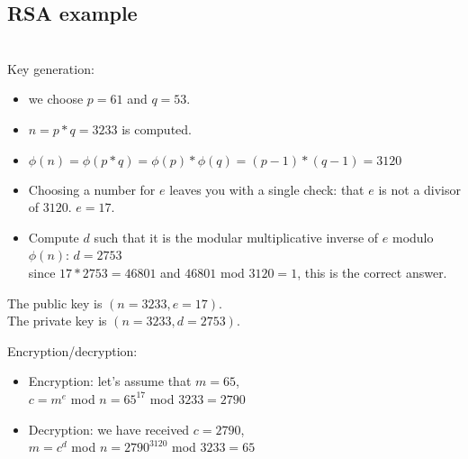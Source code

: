\subsection*{RSA example}\mbox{}\\
Key generation: \vspace{-5mm}
	\begin{itemize}
		\item we choose $p = 61$ and $q = 53 $.
		\item $n= p*q=  3233$ is computed.
		\item $\phi(n)= \phi(p*q)=\phi(p)*\phi(q)=(p-1)*(q-1)=  3120$
		\item Choosing a number for $e$ leaves you with a single check: 
		that $e$ is not a divisor of $3120$. $e = 17$.\\
		\item Compute $d$ such that it is the modular multiplicative inverse of $e$ modulo $\phi(n)$: 
		$d = 2753$\\
		since $17 * 2753 = 46801$ and $46801$ mod $3120 = 1$, this is the correct answer.
	\end{itemize}
	\begin{center}
		The public key is $(n = 3233, e = 17)$.\\
		The private key is $(n = 3233, d = 2753)$. \\	
	\end{center}
Encryption/decryption: \vspace{-5mm}
	\begin{itemize}
		\item Encryption: let's assume that $m = 65$,\\
		$c = m^e$ mod $n = 65^{17}$ mod $3233 = 2790$
		\item Decryption: we have received $c = 2790$,\\
		$m = c^d$ mod $n = 2790^{3120}$ mod $3233 = 65$
	\end{itemize}


